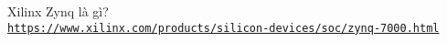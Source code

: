 \cleardoublepage
\renewcommand{\bibname}{Tài liệu tham khảo}
\begin{thebibliography}{80}
Xilinx Zynq là gì?
\\\texttt{\url{https://www.xilinx.com/products/silicon-devices/soc/zynq-7000.html}}

\end{thebibliography}

